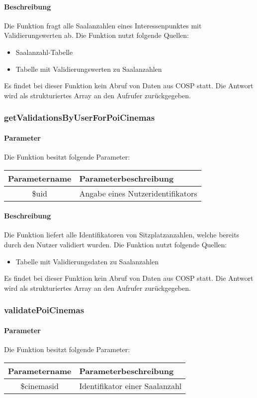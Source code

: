 \paragraph{Beschreibung} Die Funktion fragt alle Saalanzahlen eines Interessenpunktes mit Validierungswerten ab. Die Funktion nutzt folgende Quellen:
\begin{itemize}
	\item Saalanzahl-Tabelle
	\item Tabelle mit Validierungswerten zu Saalanzahlen
\end{itemize}
Es findet bei dieser Funktion kein Abruf von Daten aus {\glqq COSP\grqq} statt. Die Antwort wird als strukturiertes Array an den Aufrufer zurückgegeben.
\subsubsection{getValidationsByUserForPoiCinemas}
\paragraph{Parameter} Die Funktion besitzt folgende Parameter:
\begin{table}[H]
	\begin{tabular}{|c|p{11cm}|}
		\hline
		\textbf{Parametername} & \textbf{Parameterbeschreibung} \\ \hline
		\$uid & Angabe eines Nutzeridentifikators \\ \hline
	\end{tabular}
\end{table}
\paragraph{Beschreibung} Die Funktion liefert alle Identifikatoren von Sitzplatzanzahlen, welche bereits durch den Nutzer validiert wurden. Die Funktion nutzt folgende Quellen:
\begin{itemize}
	\item Tabelle mit Validierungsdaten zu Saalanzahlen
\end{itemize}
Es findet bei dieser Funktion kein Abruf von Daten aus {\glqq COSP\grqq} statt. Die Antwort wird als strukturiertes Array an den Aufrufer zurückgegeben.
\subsubsection{validatePoiCinemas}
\paragraph{Parameter} Die Funktion besitzt folgende Parameter:
\begin{table}[H]
	\begin{tabular}{|c|p{11cm}|}
		\hline
		\textbf{Parametername} & \textbf{Parameterbeschreibung} \\ \hline
		\$cinemasid & Identifikator einer Saalanzahl \\ \hline
	\end{tabular}
\end{table}
